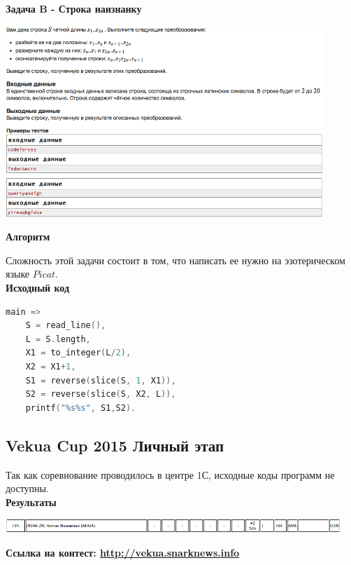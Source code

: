 \documentclass[a4paper,12pt]{article}
\begin{document}
\textbf{{\large Задача B - Строка наизнанку}} \\
\begin{center}
\includegraphics[width=0.9\textwidth]{VK_1/VK_1_B.png}\\ [1cm]
\end{center}

\textbf{{\large Алгоритм}}

Сложность этой задачи состоит в том, что написать ее нужно на эзотерическом языке $Picat$.\\

\textbf{{\large Исходный код}} \\
\begin{lstlisting}[language=C]
main =>
    S = read_line(),
    L = S.length,
    X1 = to_integer(L/2),
    X2 = X1+1,
    S1 = reverse(slice(S, 1, X1)),
    S2 = reverse(slice(S, X2, L)),
    printf("%s%s", S1,S2).
\end{lstlisting}



%
%
\newpage
\subsection{Vekua Cup 2015 Личный этап}

Так как соревнование проводилось в центре 1С, исходные коды программ не доступны. \\

\textbf{{\large Результаты}} \\
\begin{center}
\includegraphics[width=0.95\textwidth]{Vekua_personal/A_Vekua_personal_result.png}\\ [1cm]
\end{center}

\textbf{{\large Ссылка на контест: \url{http://vekua.snarknews.info}}}
\end{document}
